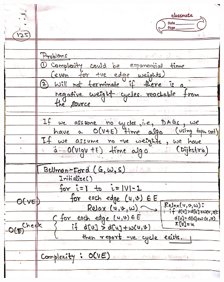 \begin{figure}[H]
    \centering
    \includegraphics[scale=0.25]{"./MIT 6.006/MIT_6006_125"}
\end{figure}
\newpage
